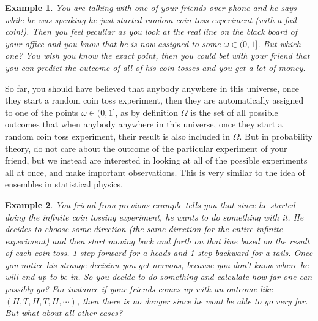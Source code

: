 \documentclass[11pt,a4paper]{article}
\theoremstyle{Example}
\newtheorem{example}{Example}
\begin{document}
 	\begin{example}
 		You are talking with one of your friends over phone and he says while he was speaking he just started random coin toss experiment (with a fail coin!). Then you feel peculiar as you look at the real line on the black board of your office and you know that he is now assigned to some $ \omega \in (0,1] $. But which one? You wish you know the exact point, then you could bet with your friend that you can predict the outcome of all of his coin tosses and you get a lot of money.
 	\end{example}
 	
 	So far, you should have believed that anybody anywhere in this universe, once they start a random coin toss experiment, then they are automatically assigned to one of the points $ \omega \in (0,1] $, as by definition $ \Omega $ is the set of all possible outcomes that when anybody anywhere in this universe, once they start a random coin toss experiment, their result is also included in $ \Omega $. But in probability theory, do not care about the outcome of the particular experiment of your friend, but we instead are interested in looking at all of the possible experiments all at once, and make important observations. This is very similar to the idea of ensembles in statistical physics.
 	
 	\begin{example}
 		You friend from previous example tells you that since he started doing the infinite coin tossing experiment, he wants to do something with it. He decides to choose some direction (the same direction for the entire infinite experiment) and then start moving back and forth on that line based on the result of each coin toss. 1 step forward for a heads and 1 step backward for a tails. Once you notice his strange decision you get nervous, because you don't know where he will end up to be in. So you decide to do something and calculate how far one can possibly go? For instance if your friends comes up with an outcome like $ (H,T,H,T,H,\cdots) $, then there is no danger since he wont be able to go very far. But what about all other cases?
 	\end{example}
 	
\end{document}
